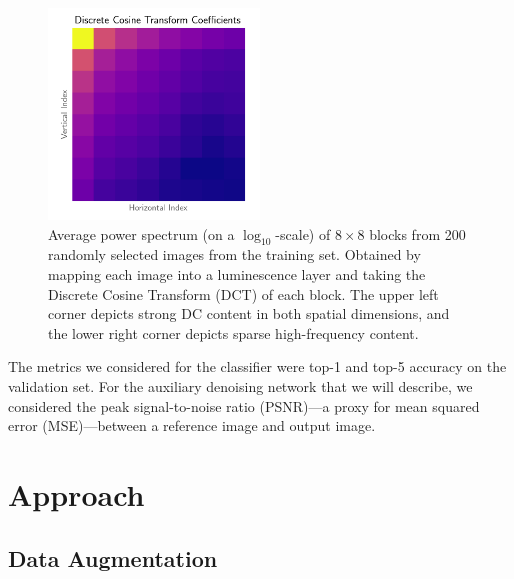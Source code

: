 \documentclass[justified]{article}
\begin{document}
  \begin{figure}[H]
    \centering
    \includegraphics[width=0.5\textwidth]{figures/dct}
    \caption{
      Average power spectrum (on a $\log_{10}$-scale) of $8 \times 8$ blocks from 200 randomly selected images from the training set.
      Obtained by mapping each image into a luminescence layer and taking the Discrete Cosine Transform (DCT) of each block.
      The upper left corner depicts strong DC content in both spatial dimensions, and the lower right corner depicts sparse high-frequency content.
    }
  \end{figure}

  The metrics we considered for the classifier were top-1 and top-5 accuracy on the validation set.
  For the auxiliary denoising network that we will describe, we considered the peak signal-to-noise ratio (PSNR)---a proxy for mean squared error (MSE)---between a reference image and output image.

  \section{Approach}

  \subsection{Data Augmentation}
\end{document}
